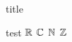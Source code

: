 \documentclass[12pt]{report}
\begin{document}
	
	{title}
	
	test
	$\mathbb{R}$
	$\mathbb{C}$
	$\mathbb{N}$
	$\mathbb{Z}$
	
	
\end{document}
